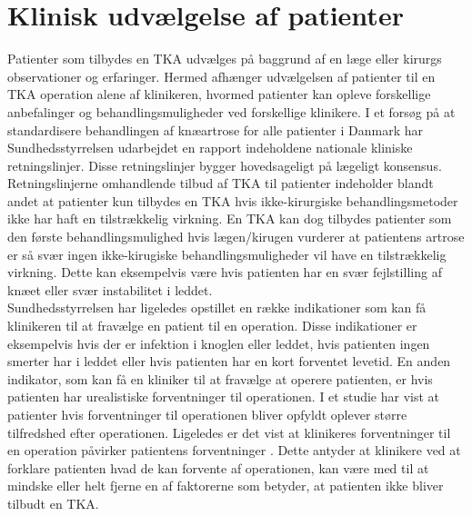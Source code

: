 \section{Klinisk udvælgelse af patienter}

Patienter som tilbydes en TKA udvælges på baggrund af en læge eller kirurgs observationer og erfaringer.
Hermed afhænger udvælgelsen af patienter til en TKA operation alene af klinikeren, hvormed patienter kan opleve forskellige anbefalinger og behandlingsmuligheder ved forskellige klinikere. I et forsøg på at standardisere behandlingen af knæartrose for alle patienter i Danmark har Sundhedsstyrrelsen udarbejdet en rapport indeholdene nationale kliniske retningslinjer. Disse retningslinjer bygger hovedsageligt på lægeligt konsensus. Retningslinjerne omhandlende tilbud af TKA til patienter indeholder blandt andet at patienter kun tilbydes en TKA hvis ikke-kirurgiske behandlingsmetoder ikke har haft en tilstrækkelig virkning. En TKA kan dog tilbydes patienter som den første behandlingsmulighed hvis lægen/kirugen vurderer at patientens artrose er så svær ingen ikke-kirugiske behandlingsmuligheder vil have en tilstrækkelig virkning. Dette kan eksempelvis være hvis patienten har en svær fejlstilling af knæet eller svær instabilitet i leddet. \citep{brostrom2012} \\
Sundhedsstyrrelsen har ligeledes opstillet en række indikationer som kan få klinikeren til at fravælge en patient til en operation. Disse indikationer er eksempelvis hvis der er infektion i knoglen eller leddet, hvis patienten ingen smerter har i leddet eller hvis patienten har en kort forventet levetid. En anden indikator, som kan få en kliniker til at fravælge at operere patienten, er hvis patienten har urealistiske forventninger til operationen. \citep{brostrom2012} I et studie har \cite{tejada2010} vist at patienter hvis forventninger til operationen bliver opfyldt oplever større tilfredshed efter operationen. Ligeledes er det vist at klinikeres forventninger til en operation påvirker patientens forventninger \citep{tejada2010}. Dette antyder at klinikere ved at forklare patienten hvad de kan forvente af operationen, kan være med til at mindske eller helt fjerne en af faktorerne som betyder, at patienten ikke bliver tilbudt en TKA. \\
